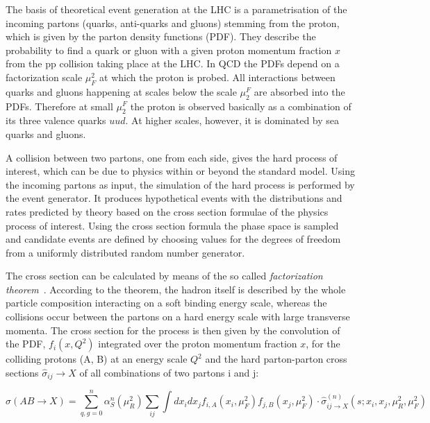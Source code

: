 The basis of theoretical event generation at the LHC is a parametrisation of the incoming partons (quarks, anti-quarks and gluons) stemming from the proton, which is given by the parton density functions (PDF).
They describe the probability to find a quark or gluon with a given proton momentum fraction $x$ from the pp collision taking place at the LHC.
In QCD the PDFs depend on a factorization scale $\mu^2_F$ at which the proton is probed.
All interactions between quarks and gluons happening at scales below the scale $\mu_2^F$ are absorbed into the PDFs. Therefore at small $\mu_2^F$ the proton is observed basically as a combination of its
three valence quarks $uud$. At higher scales, however, it is dominated by sea quarks and gluons.

A collision between two partons, one from each side, gives the hard process of interest, which can be due to physics within or beyond the standard model.
Using the incoming partons as input, the simulation of the hard process is performed by the event generator.
It produces hypothetical events with the distributions and rates predicted by theory based on the cross section formulae of the physics process of interest.
Using the cross section formula the phase space is sampled and candidate events are defined by choosing values for the degrees of freedom from a uniformly distributed random number generator.

The cross section can be calculated by means of the so called {\itshape factorization theorem}~\cite{Collins:1987pm}.
According to the theorem, the hadron itself is described by the whole particle composition interacting on a soft binding energy scale,
whereas the collisions occur between the partons on a hard energy scale with large transverse momenta.
The cross section for the process is then given by the convolution of the PDF, $f_i(x,Q^2)$ integrated over the proton momentum fraction $x$, for the colliding protons (A, B) at an energy scale $Q^2$
and the hard parton-parton cross sections $\hat{\sigma}_{ij} \rightarrow X$ of all combinations of two partons i and j:

\begin{equation}
\sigma(AB \rightarrow X) = \sum_{q,g=0}^{n} \alpha_S^n(\mu_R^2)\sum_{ij}\int dx_i dx_j f_{i,A}(x_i,\mu_F^2) f_{j,B}(x_j,\mu_F^2) \cdot \hat{\sigma}^{(n)}_{ij\rightarrow X}(s;x_i,x_j,\mu_R^2,\mu_F^2)
\end{equation}

